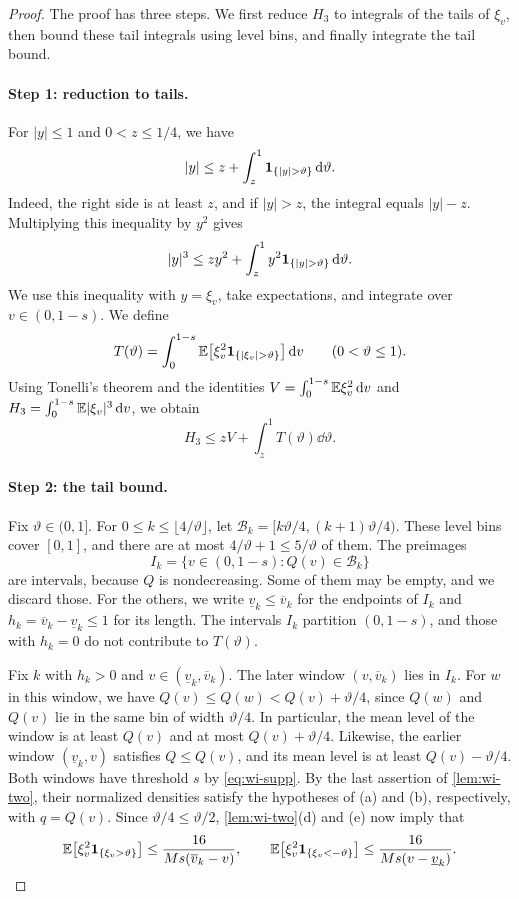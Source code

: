 \begin{proof}
The proof has three steps. We first reduce $H_3$ to integrals of the
tails of $\xi_v$, then bound these tail integrals using level bins, and
finally integrate the tail bound.

\paragraph{Step 1: reduction to tails.}
For $|y|\le1$ and $0<z\le1/4$, we have
\[
 |y|\le z+\int_z^1\ind_{\{|y|>\vartheta\}}\dd\vartheta .
\]
Indeed, the right side is at least $z$, and if $|y|>z$, the integral
equals $|y|-z$. Multiplying this inequality by $y^2$ gives
\[
 |y|^3\le zy^2+\int_z^1y^2\ind_{\{|y|>\vartheta\}}\dd\vartheta .
\]
We use this inequality with $y=\xi_v$, take expectations, and
integrate over $v\in(0,1-s)$. We define
\[
 T(\vartheta)=\int_0^{1-s}
 \E\bigl[\xi_v^2\ind_{\{|\xi_v|>\vartheta\}}\bigr]\dd v
 \qquad(0<\vartheta\le1).
\]
Using Tonelli's theorem and the identities
$V=\int_0^{1-s}\mathbb E\xi_v^2\,\mathrm d v$ and $H_3=\int_0^{1-s}\mathbb E|\xi_v|^3\,\mathrm d v$, we
obtain
\begin{equation}\label{eq:wi-layer}
 H_3\le zV+\int_z^1T(\vartheta)\dd\vartheta.
\end{equation}

\paragraph{Step 2: the tail bound.}
Fix $\vartheta\in(0,1]$. For $0\le k\le\lfloor4/\vartheta\rfloor$, let
$\mathcal B_k=[k\vartheta/4,(k+1)\vartheta/4)$. These level bins cover
$[0,1]$, and there are at most $4/\vartheta+1\le5/\vartheta$ of them.
The preimages
\[
 I_k=\{v\in(0,1-s):Q(v)\in\mathcal B_k\}
\]
are intervals, because $Q$ is nondecreasing. Some of them may be empty,
and we discard those. For the others, we write
$\underline v_k\le\overline v_k$ for the endpoints of $I_k$ and $h_k=\overline v_k-\underline v_k\le1$ for its
length. The intervals $I_k$ partition $(0,1-s)$, and those with
$h_k=0$ do not contribute to $T(\vartheta)$.

Fix $k$ with $h_k>0$ and $v\in(\underline v_k,\overline v_k)$. The later
window $(v,\overline v_k)$ lies in $I_k$. For $w$ in this window, we
have $Q(v)\le Q(w)<Q(v)+\vartheta/4$, since $Q(w)$ and $Q(v)$ lie in the
same bin of width $\vartheta/4$. In particular, the mean level of the
window is at least $Q(v)$ and at most $Q(v)+\vartheta/4$. Likewise, the earlier window
$(\underline v_k,v)$ satisfies $Q\le Q(v)$, and its mean level is at
least $Q(v)-\vartheta/4$. Both windows have threshold $s$ by
\eqref{eq:wi-supp}. By the last assertion of \cref{lem:wi-two}, their
normalized densities satisfy the hypotheses of (a) and (b),
respectively, with $q=Q(v)$. Since $\vartheta/4\le\vartheta/2$,
\cref{lem:wi-two}(d) and (e) now imply that
\[
 \mathbb E\bigl[\xi_v^2\mathbf1_{\{\xi_v>\vartheta\}}\bigr]
 \le\frac{16}{Ms(\overline v_k-v)},\qquad
 \mathbb E\bigl[\xi_v^2\mathbf1_{\{\xi_v<-\vartheta\}}\bigr]
 \le\frac{16}{Ms(v-\underline v_k)} .
\]


\end{proof}
